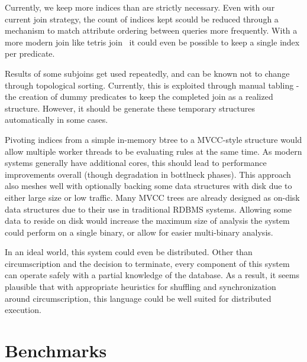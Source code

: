 Currently, we keep more indices than are strictly necessary.
Even with our current join strategy, the count of indices kept scould be reduced through a mechanism to match attribute ordering between queries more frequently.
With a more modern join like tetris join~\cite{tetris} it could even be possible to keep a single index per predicate.

Results of some subjoins get used repeatedly, and can be known not to change through topological sorting.
Currently, this is exploited through manual tabling - the creation of dummy predicates to keep the completed join as a realized structure.
However, it should be generate these temporary structures automatically in some cases.

Pivoting indices from a simple in-memory btree to a MVCC-style structure would allow multiple worker threads to be evaluating rules at the same time.
As modern systems generally have additional cores, this should lead to performance improvements overall (though degradation in bottlneck phases).
This approach also meshes well with optionally backing some data structures with disk due to either large size or low traffic.
Many MVCC trees are already designed as on-disk data structures due to their use in traditional RDBMS systems.
Allowing some data to reside on disk would increase the maximum size of analysis the system could perform on a single binary, or allow for easier multi-binary analysis.

In an ideal world, this system could even be distributed.
Other than circumscription and the decision to terminate, every component of this system can operate safely with a partial knowledge of the database.
As a result, it seems plausible that with appropriate heuristics for shuffling and synchronization around circumscription, this language could be well suited for distributed execution.
\section{Benchmarks}
